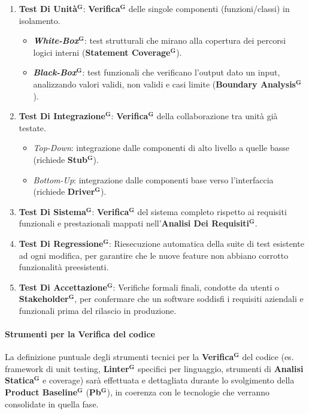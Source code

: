 \documentclass[a4paper,12pt]{article}
\newcommand{\term}[1]{\textbf{#1}$^\mathbf{G}$}
\newcommand{\ignoreglossary}{}
\begin{document}
\begin{enumerate}
    \item \textbf{\term{Test Di Unità}}: \term{Verifica} delle singole componenti (funzioni/classi) in isolamento.
    \begin{itemize}
        \item \textit{\term{White-Box}}: test strutturali che mirano alla copertura dei percorsi logici interni (\term{Statement Coverage}).
        \item \textit{\term{Black-Box}}: test funzionali che verificano l'output dato un input, analizzando valori validi, non validi e casi limite (\term{Boundary Analysis}).
    \end{itemize}
    
    \item \textbf{\term{Test Di Integrazione}}: \term{Verifica} della collaborazione tra unità già testate.
    \begin{itemize}
        \item \textit{Top-Down}: integrazione dalle componenti di alto livello a quelle basse (richiede \textbf{\term{Stub}}).
        \item \textit{Bottom-Up}: integrazione dalle componenti base verso l'interfaccia (richiede \textbf{\term{Driver}}).
    \end{itemize}
    
    \item \textbf{\term{Test Di Sistema}}: \term{Verifica} del sistema completo rispetto ai requisiti funzionali e prestazionali mappati nell'\term{Analisi Dei Requisiti}.
    
    \item \textbf{\term{Test Di Regressione}}: Riesecuzione automatica della suite di test esistente ad ogni modifica, per garantire che le nuove feature non abbiano corrotto funzionalità preesistenti.

    \item \textbf{\term{Test Di Accettazione}}: Verifiche formali finali, condotte da utenti o \term{Stakeholder}, per confermare che un software soddisfi i requisiti aziendali e funzionali prima del rilascio in produzione.
\end{enumerate}

\paragraph{Strumenti per la \ignoreglossary{Verifica} del codice}
La definizione puntuale degli strumenti tecnici per la \term{Verifica} del codice (es. framework di unit testing, \term{Linter} specifici per linguaggio, strumenti di \term{Analisi Statica} e coverage) sarà effettuata e dettagliata durante lo svolgimento della \textbf{Product \term{Baseline}} (\term{Pb}), in coerenza con le tecnologie che verranno consolidate in quella fase.
\end{document}
